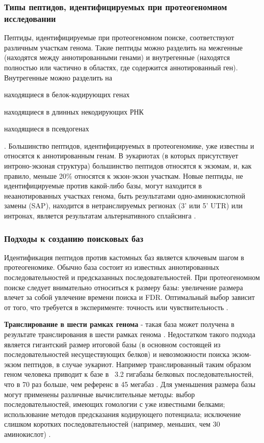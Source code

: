 \subsubsection{Типы пептидов, идентифицируемых при протеогеномном исследовании}
Пептиды, идентифицируемые при протеогеномном поиске, соответствуют различным участкам генома. Такие пептиды можно разделить на межгенные (находятся между аннотированными генами) и внутрегенные (находятся полностью или частично в областях, где содержится аннотированный ген). Внутрегенные можно разделить на 
\begin{inparaenum}
    \item находящиеся в белок-кодирующих генах 
    \item находящиеся в длинных некодирующих РНК
    \item находящиеся в псевдогенах
\end{inparaenum} \cite{harrow2012gencode}. Большинство пептидов, идентифицируемых в протеогеномике, уже известны и относятся к аннотированным генам. В эукариотах (в которых присутствует интроно-экзоная структура) большинство пептидов относятся к экзомам, и, как правило, меньше 20\% относятся к экзон-экзон участкам. Новые пептиды, не идентифицируемые против какой-либо базы, могут находится в неаанотированных участках генома, быть результатами одно-аминокислотной замены (SAP), находится в нетранслируемых регионах (3' или 5' UTR) или интронах, является результатам альтернативного сплайсинга \cite{nesvizhskii2014proteogenomics}.

\subsubsection{Подходы к созданию поисковых баз}
Идентификация пептидов против кастомных баз является ключевым шагом в протеогеномике. Обычно база состоит из известных аннотированных последовательностей и предсказанных последовательностей. При протеогеномном поиске следует внимательно относиться к размеру базы: увеличение размера влечет за собой увлечение времени поиска и FDR. Оптимальный выбор зависит от того, что требуется в эксперименте: точность или чувствительность \cite{nesvizhskii2014proteogenomics}.

\textbf{Транслирование в шести рамках генома} - такая база может получена в результате транслирования в шести рамках генома \cite{baerenfaller2008genome}. Недостатком такого подхода является гигантский размер итоговой базы (в основном состоящей из последовательностей несуществующих белков) и невозможности поиска экзом-экзом пептидов, в случае эукариот. Например транслированный таким образом геном человека приводит к базе в ~3.2 гигабазы белковых последовательностей, что в 70 раз больше, чем референс в 45 мегабаз \cite{khatun2013whole}. Для уменьшения размера базы могут применены различные вычислительные методы: выбор последовательностей, имеющих гомологии с уже известными белками; использование методов предсказания кодирующего потенциала; исключение слишком коротких последовательностей (например, меньших, чем 30 аминокислот) \cite{blakeley2012addressing}. 

